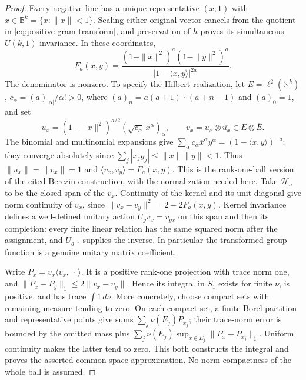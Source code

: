 \begin{proof}
Every negative line has a unique representative $(x,1)$ with
$x\in\mathbb B^k=\{x:\|x\|<1\}$.  Scaling either original vector cancels
from the quotient in \eqref{eq:positive-gram-transform}, and preservation of
$h$ proves its simultaneous $U(k,1)$ invariance.  In these coordinates,
\[
 F_a(x,y)=
 \frac{(1-\|x\|^2)^a(1-\|y\|^2)^a}
 {|1-\langle x,y\rangle|^{2a}}.
\]
The denominator is nonzero.  To specify the Hilbert realization, let
$E=\ell^2(\mathbb N^k)$, $c_\alpha=(a)_{|\alpha|}/\alpha!>0$, where
$(a)_n=a(a+1)\cdots(a+n-1)$ and $(a)_0=1$, and set
\[
 u_x=(1-\|x\|^2)^{a/2}
       (\sqrt{c_\alpha}\,x^\alpha)_\alpha,
 \qquad v_x=u_x\otimes\overline{u_x}\in E\otimes\overline E.
\]
The binomial and multinomial expansions give
$\sum_\alpha c_\alpha\overline{x}^\alpha y^\alpha
=(1-\langle x,y\rangle)^{-a}$; they converge absolutely since
$\sum_j|x_jy_j|\le\|x\|\|y\|<1$.  Thus $\|u_x\|=\|v_x\|=1$ and
$\langle v_x,v_y\rangle=F_a(x,y)$.  This is the rank-one-ball version of
the cited Berezin construction, with the normalization needed here.
Take $\mathcal H_a$ to be the closed span of the $v_x$.  Continuity of the
kernel and its unit diagonal give norm continuity of $v_x$, since
$\|v_x-v_y\|^2=2-2F_a(x,y)$.  Kernel invariance defines a well-defined
unitary action $U_gv_x=v_{gx}$ on this span and then its completion: every
finite linear relation has the same squared norm after the assignment, and
$U_{g^{-1}}$ supplies the inverse.  In particular the transformed group
function is a genuine unitary matrix coefficient.

Write $P_x=v_x\langle v_x,\,\cdot\,\rangle$.  It is a positive rank-one
projection with trace norm one, and
$\|P_x-P_y\|_1\le2\|v_x-v_y\|$.  Hence its integral in $S_1$ exists for
finite $\nu$, is positive, and has trace $\int1\,d\nu$.  More concretely,
choose compact sets with remaining measure tending to zero.  On each compact
set, a finite Borel partition and representative points give sums
$\sum_j\nu(E_j)P_{x_j}$; their trace-norm error is bounded by the omitted
mass plus $\sum_j\nu(E_j)\sup_{x\in E_j}\|P_x-P_{x_j}\|_1$.  Uniform
continuity makes the latter tend to zero.  This both constructs the integral
and proves the asserted common-space approximation.  No norm compactness of
the whole ball is assumed.


\end{proof}

